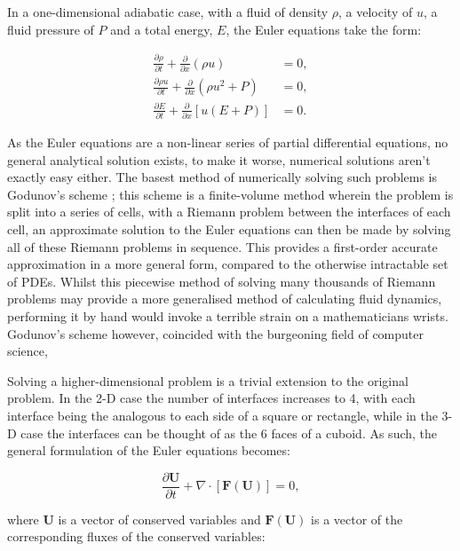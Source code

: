 In a one-dimensional adiabatic case, with a fluid of density $\rho$, a velocity of $u$, a fluid pressure of $P$ and a total energy, $E$, the Euler equations take the form:

\begin{subequations}
  \begin{align}
    \frac{\partial \rho}{\partial t} + \frac{\partial}{\partial x} (\rho u) & = 0 ,\\
    \frac{\partial \rho u}{\partial t} + \frac{\partial}{\partial x} (\rho u^2 + P) & = 0 ,\\
    \frac{\partial E}{\partial t} + \frac{\partial}{\partial x} \left[ u(E+P) \right] & = 0 .
  \end{align}
\end{subequations}

\noindent
As the Euler equations are a non-linear series of partial differential equations, no general analytical solution exists, to make it worse, numerical solutions aren't exactly easy either.
The basest method of numerically solving such problems is Godunov's scheme \parencite{godunov_difference_1959}; this scheme is a finite-volume method wherein the problem is split into a series of cells, with a Riemann problem between the interfaces of each cell, an approximate solution to the Euler equations can then be made by solving all of these Riemann problems in sequence.
This provides a first-order accurate approximation in a more general form, compared to the otherwise intractable set of PDEs. 
Whilst this piecewise method of solving many thousands of Riemann problems may provide a more generalised method of calculating fluid dynamics, performing it by hand would invoke a terrible strain on a mathematicians wrists.
Godunov's scheme however, coincided with the burgeoning field of computer science, 

Solving a higher-dimensional problem is a trivial extension to the original problem.
In the 2-D case the number of interfaces increases to 4, with each interface being the analogous to each side of a square or rectangle, while in the 3-D case the interfaces can be thought of as the 6 faces of a cuboid.
As such, the general formulation of the Euler equations becomes:

\begin{equation}
  \frac{\partial \mathbf{U}}{\partial t} + \nabla \cdot \left[ \mathbf{F}(\mathbf{U}) \right] = 0 ,
\end{equation}

\noindent
where $\mathbf{U}$ is a vector of conserved variables and $\mathbf{F}(\mathbf{U})$ is a vector of the corresponding fluxes of the conserved variables:

